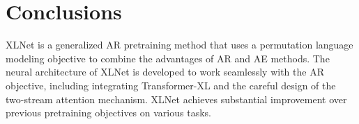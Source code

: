 
\section{Conclusions}
XLNet is a generalized AR pretraining method that uses a permutation language modeling objective to combine the advantages of AR and AE methods. The neural architecture of XLNet is developed to work seamlessly with the AR objective, including integrating Transformer-XL and the careful design of the two-stream attention mechanism. 
XLNet achieves substantial improvement over previous pretraining objectives on various tasks.
